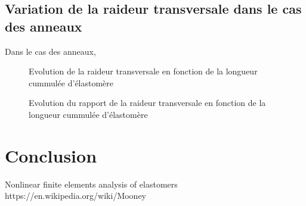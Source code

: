 ﻿\documentclass{article}
\newcommand{\cimg}{0.8}
\begin{document}
\subsection{Variation de la raideur transversale dans le cas des anneaux}
Dans le cas des anneaux, 


\begin{figure}
	\begin{minipage}[c]{.45\linewidth}
	\begin{center}
	\caption{Evolution de la raideur transversale en fonction de la longueur cummulée d'élastomère}
	\label{fig:elast_long_cum}
	\end{center}
	\end{minipage}
	\hfill
	\begin{minipage}[c]{.45\linewidth}
	\begin{center}
	\caption{Evolution du rapport de la raideur transversale en fonction de la longueur cummulée d'élastomère}
	\label{fig:elast_long_cum}
	\end{center}
	\end{minipage}
\end{figure}


\section{Conclusion}

\listoffigures

\begin{thebibliography}{9}
 Nonlinear finite elements analysis of elastomers
 https://en.wikipedia.org/wiki/Mooney%
\end{thebibliography}
\end{document}
